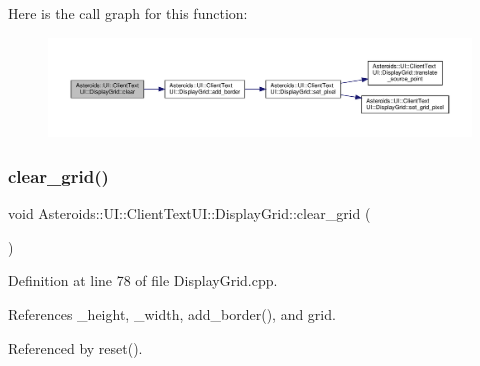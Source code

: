 Here is the call graph for this function\+:\nopagebreak
\begin{figure}[H]
\begin{center}
\leavevmode
\includegraphics[width=350pt]{classAsteroids_1_1UI_1_1ClientTextUI_1_1DisplayGrid_a7e8af47380bb1c10250090b00b578227_cgraph}
\end{center}
\end{figure}
\mbox{\label{classAsteroids_1_1UI_1_1ClientTextUI_1_1DisplayGrid_aa5b4f98a3eae7f672021228e5f484f54}} 
\subsubsection{\texorpdfstring{clear\+\_\+grid()}{clear\_grid()}}
{\footnotesize\ttfamily void Asteroids\+::\+U\+I\+::\+Client\+Text\+U\+I\+::\+Display\+Grid\+::clear\+\_\+grid (\begin{DoxyParamCaption}{ }\end{DoxyParamCaption})\hspace{0.3cm}{\ttfamily [private]}}



Definition at line 78 of file Display\+Grid.\+cpp.



References \+\_\+height, \+\_\+width, add\+\_\+border(), and grid.



Referenced by reset().

